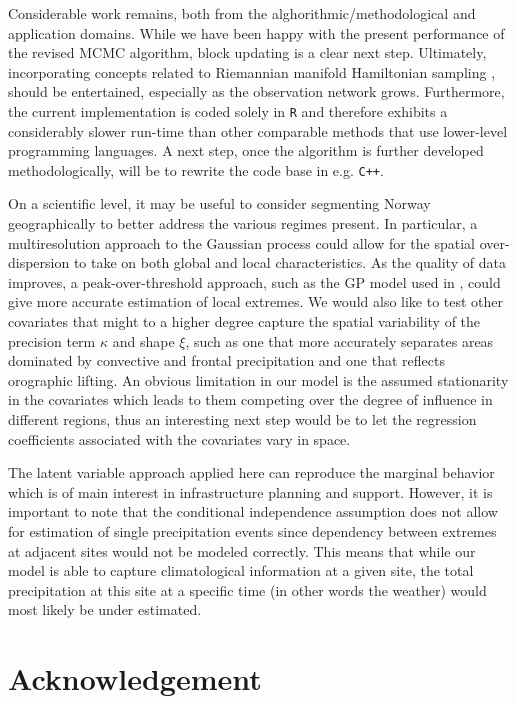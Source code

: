 \documentclass[11pt,english]{article}
\begin{document}
Considerable work remains, both from the alghorithmic/methodological and application domains. While we have been happy with the present performance of the revised MCMC algorithm, block updating \citep{RueHeld2005} is a clear next step. Ultimately, incorporating concepts related to Riemannian manifold Hamiltonian sampling \citep{girolami_calderhead_2011}, should be entertained, especially as the observation network grows.  Furthermore, the current implementation is coded solely in {\tt R} and therefore exhibits a considerably slower run-time than other comparable methods that use lower-level programming languages.  A next step, once the algorithm is further developed methodologically, will be to rewrite the code base in e.g. {\tt C++}.

On a scientific level, it may be useful to consider segmenting Norway geographically to better address the various regimes present. In particular, a multiresolution approach to the Gaussian process could allow for the spatial over-dispersion to take on both global and local characteristics. As the quality of data improves, a peak-over-threshold approach, such as the GP model used in \cite{Cooleyetal2007}, could give more accurate estimation of local extremes. We would also like to test other covariates that might to a higher degree capture the spatial variability of the precision term $\kappa$ and shape $\xi$, such as one that more accurately separates areas dominated by convective and frontal precipitation and one that reflects orographic lifting. An obvious limitation in our model is the assumed stationarity in the covariates which leads to them competing over the degree of influence in different regions, thus an interesting next step would be to let the regression coefficients associated with the covariates vary in space. 

The latent variable approach applied here can reproduce the marginal behavior which is of main interest in infrastructure planning and support. However, it is important to note that the conditional independence assumption does not allow for estimation of single precipitation events since dependency between extremes at adjacent sites would not be modeled correctly. This means that while our model is able to capture climatological information at a given site, the total precipitation at this site at a specific time (in other words the weather) would most likely be under estimated.    


\section{Acknowledgement}
\end{document}
